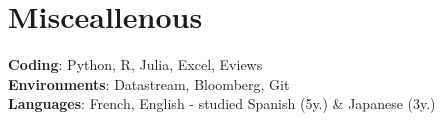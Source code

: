 \documentclass[letterpaper,10pt]{article}
\makeatletter
\newcommand{\up}[1]{\textsuperscript{#1}}
\newcommand{\resumeItem}[1]{
    \item\small{
            {#1 \vspace{-2pt}}
    }
}
\newcommand{\resumeSubheading}[4]{
    \vspace{-2pt}\item
    \begin{tabular*}{0.97\textwidth}[t]{l@{\extracolsep{\fill}}r}
        \textbf{#1}       & #2                 \\
        \textit{\small#3} & \textit{\small #4} \\
    \end{tabular*}\vspace{-7pt}
}
\newcommand{\resumeSubHeadingListStart}{\begin{itemize}[leftmargin=0.15in, label={}]}
\newcommand{\resumeSubHeadingListEnd}{\end{itemize}}
\newcommand{\resumeItemListStart}{\begin{itemize}}
\newcommand{\resumeItemListEnd}{\end{itemize}\vspace{-5pt}}
\makeatother
\begin{document}
\section{Misceallenous}
\begin{itemize}[leftmargin=0.15in, label={}]
\small{\item{
\textbf{Coding}{: Python, R, Julia, Excel, Eviews} \\
\textbf{Environments}{: Datastream, Bloomberg, Git}\\
\textbf{Languages}{: French, English - studied Spanish (5y.) \& Japanese (3y.)} \\
}}
\end{itemize}
\end{document}
